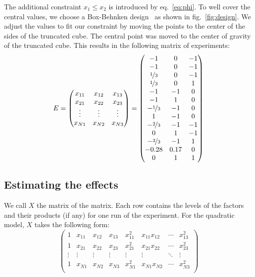 The additional constraint $ x_1 \le x_2 $ is introduced by eq.~\ref{eq:phi}. To well cover the central values, we choose a Box-Behnken design~\cite{box_behnken} as shown in fig.~\ref{fig:design}. We adjust the values to fit our constraint by moving the points to the center of the sides of the truncated cube. The central point was moved to the center of gravity of the truncated cube. This results in the following matrix of experiments:
\begin{equation}
E = \begin{pmatrix}
		x_{11}  &  x_{12}  & x_{13} \\
		x_{21}  &  x_{22}  & x_{23} \\
		\vdots & \vdots & \vdots \\
		x_{N1} & x_{N2} & x_{N3}
		\end{pmatrix} = \begin{pmatrix}
		-1  &  0  & -1 \\
		-1  &  0  & -1 \\
		\nicefrac{1}{3} &	0	& -1 \\
		\nicefrac{1}{3} &	0	& 1  \\
		-1	&	-1	& 0 \\
		-1	&	1	& 0 \\
		-\nicefrac{1}{3} &	-1	& 0 \\
		1	  & -1  & 0 \\
		-\nicefrac{2}{3} &	-1	& -1 \\
		0	  &  1	& -1 \\
		-\nicefrac{2}{3} &	-1	& 1 \\
		-0.28 & 0.17 & 0 \\
		0 	& 1 	& 1 
		\end{pmatrix}
\end{equation}



\subsection{Estimating the effects}
We call $X$ the matrix of the matrix. Each row contains the levels of the factors and their products (if any) for one run of the experiment. For the quadratic model, $X$ takes the following form:
\begin{equation}
	\begin{pmatrix}
	1 & x_{11} & x_{12} & x_{13} & x_{11}^2 & x_{11} x_{12} & \cdots & x_{13}^2 \\
	1 & x_{21} & x_{22} & x_{23} & x_{21}^2 & x_{21} x_{22} & \cdots & x_{23}^2 \\
	 \vdots & \vdots & \vdots & \vdots & \vdots & \vdots & \ddots & \vdots\\
	1 & x_{N1} & x_{N2} & x_{N3} & x_{N1}^2 & x_{N1} x_{N2} & \cdots & x_{N3}^2 \\
	\end{pmatrix}
\end{equation}

